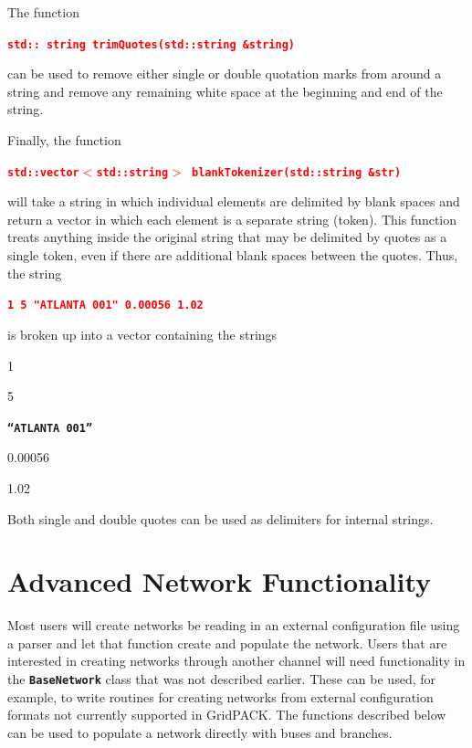 \documentclass[12pt]{report} %
\begin{document}
The function

\textcolor{red}{\texttt{\textbf{std:: string trimQuotes(std::string \&string)}}}

can be used to remove either single or double quotation marks from around a string and remove any remaining white space at the beginning and end of the string.

Finally, the function

\textcolor{red}{\texttt{\textbf{std::vector$\boldsymbol{\mathrm{<}}$std::string$\boldsymbol{\mathrm{>}}$ blankTokenizer(std::string \&str)}}}

will take a string in which individual elements are delimited by blank spaces and return a vector in which each element is a separate string (token). This function treats anything inside the original string that may be delimited by quotes as a single token, even if there are additional blank spaces between the quotes. Thus, the string

\textcolor{red}{\texttt{\textbf{1 5 "ATLANTA 001" 0.00056 1.02}}}

is broken up into a vector containing the strings


1

5

\texttt{\textbf{``ATLANTA 001''}}

0.00056

1.02

Both single and double quotes can be used as delimiters for internal strings.

\section{Advanced Network Functionality}

Most users will create networks be reading in an external configuration file using a parser and let that function create and populate the network. Users that are interested in creating networks through another channel will need functionality in the \texttt{\textbf{BaseNetwork}} class that was not described earlier. These can be used, for example, to write routines for creating networks from external configuration formats not currently supported in GridPACK. The functions described below can be used to populate a network directly with buses and branches.
\end{document}
